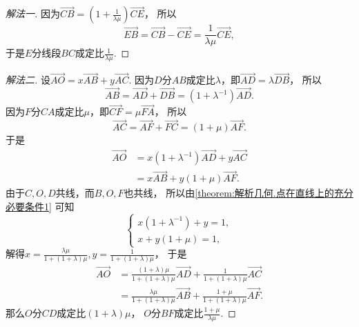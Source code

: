\begin{example}
\begin{solution}
\begin{proof}[解法一]
因为\(\vec{CB} = \left( 1 + \frac{1}{\lambda\mu} \right) \vec{CE}\)，
所以\begin{equation*}
	\vec{EB}
	= \vec{CB} - \vec{CE}
	= \frac{1}{\lambda\mu} \vec{CE},
\end{equation*}
于是\(E\)分线段\(BC\)成定比\(\frac{1}{\lambda\mu}\).
\end{proof}
\begin{proof}[解法二]
设\(\vec{AO} = x \vec{AB} + y \vec{AC}\).
因为\(D\)分\(AB\)成定比\(\lambda\)，即\(\vec{AD} = \lambda \vec{DB}\)，
所以\begin{equation*}
	\vec{AB}
	= \vec{AD} + \vec{DB}
	= (1+\lambda^{-1}) \vec{AD}.
\end{equation*}
因为\(F\)分\(CA\)成定比\(\mu\)，即\(\vec{CF} = \mu \vec{FA}\)，
所以\begin{equation*}
	\vec{AC}
	= \vec{AF} + \vec{FC}
	= (1+\mu) \vec{AF}.
\end{equation*}
于是\begin{align*}
	\vec{AO}
	&= x (1+\lambda^{-1}) \vec{AD}
	+ y \vec{AC} \\
	&= x \vec{AB}
	+ y (1+\mu) \vec{AF}.
\end{align*}
由于\(C,O,D\)共线，而\(B,O,F\)也共线，
所以由\cref{theorem:解析几何.点在直线上的充分必要条件1} 可知\begin{equation*}
	\begin{cases}
		x (1+\lambda^{-1}) + y = 1, \\
		x + y (1+\mu) = 1,
	\end{cases}
\end{equation*}
解得\(
	x = \frac{\lambda\mu}{1+(1+\lambda)\mu},
	y = \frac{1}{1+(1+\lambda)\mu}
\)，
于是\begin{align*}
	\vec{AO}
	&= \frac{(1+\lambda)\mu}{1+(1+\lambda)\mu} \vec{AD}
	+ \frac{1}{1+(1+\lambda)\mu} \vec{AC} \\
	&= \frac{\lambda\mu}{1+(1+\lambda)\mu} \vec{AB}
	+ \frac{1+\mu}{1+(1+\lambda)\mu} \vec{AF}.
\end{align*}
那么\(O\)分\(CD\)成定比\(
	(1+\lambda)\mu
\)，
\(O\)分\(BF\)成定比\(
	\frac{1+\mu}{\lambda\mu}
\).


\end{proof}
\end{solution}
\end{example}
